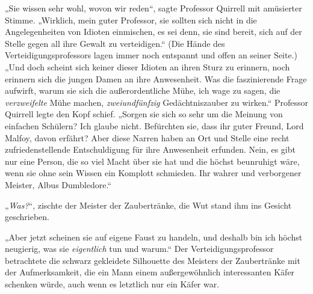 „Sie wissen sehr wohl, wovon wir reden“, sagte Professor Quirrell mit amüsierter Stimme.
„Wirklich, mein guter Professor, sie sollten sich nicht in die Angelegenheiten von Idioten einmischen, es sei denn, sie sind bereit, sich auf der Stelle gegen all ihre Gewalt zu verteidigen.“ (Die Hände des Verteidigungsprofessors lagen immer noch entspannt und offen an seiner Seite.)
„Und doch scheint sich keiner dieser Idioten an ihren Sturz zu erinnern, noch erinnern sich die jungen Damen an ihre Anwesenheit. Was die faszinierende Frage aufwirft, warum sie sich die außerordentliche Mühe, ich wage zu sagen, die \emph{verzweifelte} Mühe machen, \emph{zweiundfünfzig} Gedächtniszauber zu wirken.“ Professor Quirrell legte den Kopf schief.
„Sorgen sie sich so sehr um die Meinung von einfachen Schülern? Ich glaube nicht. Befürchten sie, dass ihr guter Freund, Lord Malfoy, davon erfährt? Aber diese Narren haben an Ort und Stelle eine recht zufriedenstellende Entschuldigung für ihre Anwesenheit erfunden. Nein, es gibt nur eine Person, die so viel Macht über sie hat und die höchst beunruhigt wäre, wenn sie ohne sein Wissen ein Komplott schmieden. Ihr wahrer und verborgener Meister, Albus Dumbledore.“

„\emph{Was?}“, zischte der Meister der Zaubertränke, die Wut stand ihm ins Gesicht geschrieben.

„Aber jetzt scheinen sie auf eigene Faust zu handeln, und deshalb bin ich höchst neugierig, was sie \emph{eigentlich} tun und warum.“ Der Verteidigungsprofessor betrachtete die schwarz gekleidete Silhouette des Meisters der Zaubertränke mit der Aufmerksamkeit, die ein Mann einem außergewöhnlich interessanten Käfer schenken würde, auch wenn es letztlich nur ein Käfer war.

